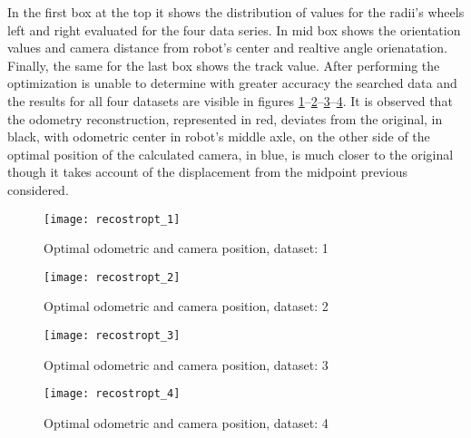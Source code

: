 In the first box at the top it shows the distribution of values for the radii's wheels left and right evaluated for the four data series.
In mid box shows the orientation values and camera distance from robot's center and realtive angle orienatation.
Finally, the same for the last box shows the track value.
After performing the optimization is unable to determine with greater accuracy the searched data and the results for all four datasets are visible in figures \ref{fig:OptiOdo1}--\ref{fig:OptiOdo2}--\ref{fig:OptiOdo3}--\ref{fig:OptiOdo4}.
It is observed that the odometry reconstruction, represented in red, deviates from the original, in black, with odometric center in robot's middle axle, on the other side of the optimal position of the calculated camera, in blue, is much closer to the original though it takes account of the displacement from the midpoint previous considered.
\begin{figure}[htb]
   {\texttt{[image: recostropt\_1]}}
   \caption{Optimal odometric and camera position, dataset: 1}
   \label{fig:OptiOdo1}
\end{figure}

\begin{figure}[h]
   {\texttt{[image: recostropt\_2]}}
   \caption{Optimal odometric and camera position, dataset: 2}
   \label{fig:OptiOdo2}
\end{figure}

\begin{figure}[h]
   {\texttt{[image: recostropt\_3]}} 
   \caption{Optimal odometric and camera position, dataset: 3}
   \label{fig:OptiOdo3}
\end{figure}

\begin{figure}[h]
   {\texttt{[image: recostropt\_4]}}
\caption{Optimal odometric and camera position, dataset: 4}
\label{fig:OptiOdo4}
\end{figure}